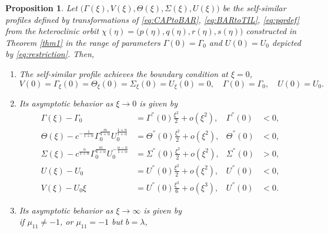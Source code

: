 \documentclass[usletter,11pt]{article}
\newtheorem{proposition}{Proposition}[section]
\theoremstyle{remark}
\begin{document}
%
%
\begin{proposition} \label{prop:ss}
Let $\big(\Gamma(\xi),V(\xi),\Theta(\xi),\Sigma(\xi),U(\xi)\big)$ be the self-similar profiles defined by transformations of \eqref{eq:CAPtoBAR}, \eqref{eq:BARtoTIL}, \eqref{eq:pqrdef} 
from the heteroclinic orbit $\chi(\eta)=\big(p(\eta),q(\eta),r(\eta),s(\eta)\big)$ constructed in Theorem \ref{thm1} in the range of  parameters $\Gamma(0)=\Gamma_0$ and $U(0)=U_0$  
depicted by \eqref{eq:restriction}. Then,
 \begin{enumerate}
  \item[(i)] The self-similar profile achieves the boundary condition at $\xi=0$,
    \begin{equation*}
    {V}(0) = \Gamma_\xi(0) = \Theta_\xi(0)=\Sigma_\xi(0) = {U}_\xi(0)=0, \quad \Gamma(0)=\Gamma_0, \quad U(0)=U_0.
  \end{equation*}
  \item[(ii)] Its asymptotic behavior as $\xi \rightarrow 0$ is given by
  \begin{equation} \label{eq:ss_asymp0}
  \begin{aligned}
    \Gamma(\xi) -\Gamma_0 &= \Gamma^{''}(0)\frac{\xi^2}{2} + o(\xi^2), & \Gamma^{''}(0)&<0,\\
    \Theta(\xi) - c^{-\frac{1}{1+\alpha}}\Gamma_0^{\frac{m}{1+\alpha}} U_0^{\frac{1+n}{1+\alpha}} &= \Theta^{''}(0)\frac{\xi^2}{2} + o(\xi^2), & \Theta^{''}(0)&<0,\\
    \Sigma(\xi) - c^{\frac{\alpha}{1+\alpha}}\Gamma_0^{\frac{m}{1+\alpha}} U_0^{-\frac{\alpha-n}{1+\alpha}} &= \Sigma^{''}(0)\frac{\xi^2}{2} + o(\xi^2), & \Sigma^{''}(0)&>0, \\
    U(\xi) - U_0 &= U^{''}(0)\frac{\xi^2}{2} + o(\xi^2), & U^{''}(0)&<0,\\
    V(\xi) - U_0\xi &= U^{''}(0)\frac{\xi^3}{6} + o(\xi^3), & U^{''}(0)&<0.
  \end{aligned}
  \end{equation}
  \item[(iii)] Its asymptotic behavior as $\xi \rightarrow \infty$ is given by\\
  if $\mu_{11}\ne-1$, or $\mu_{11}=-1$ but $b=\lambda$,

\end{enumerate}
\end{proposition}
\end{document}
